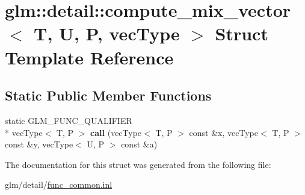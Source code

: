 \hypertarget{structglm_1_1detail_1_1compute__mix__vector}{\section{glm\-:\-:detail\-:\-:compute\-\_\-mix\-\_\-vector$<$ T, U, P, vec\-Type $>$ Struct Template Reference}
\label{structglm_1_1detail_1_1compute__mix__vector}
}
\subsection*{Static Public Member Functions}
\begin{DoxyCompactItemize}
\item 
\hypertarget{structglm_1_1detail_1_1compute__mix__vector_a68153ea8943ca1ffac025040a197c590}{static G\-L\-M\-\_\-\-F\-U\-N\-C\-\_\-\-Q\-U\-A\-L\-I\-F\-I\-E\-R \\*
vec\-Type$<$ T, P $>$ {\bfseries call} (vec\-Type$<$ T, P $>$ const \&x, vec\-Type$<$ T, P $>$ const \&y, vec\-Type$<$ U, P $>$ const \&a)}\label{structglm_1_1detail_1_1compute__mix__vector_a68153ea8943ca1ffac025040a197c590}

\end{DoxyCompactItemize}


The documentation for this struct was generated from the following file\-:\begin{DoxyCompactItemize}
\item 
glm/detail/\hyperlink{func__common_8inl}{func\-\_\-common.\-inl}\end{DoxyCompactItemize}
